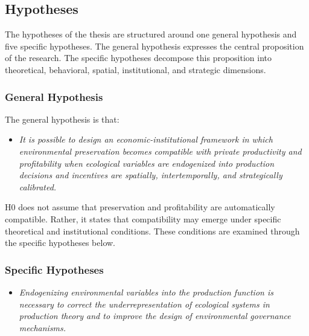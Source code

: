 \subsection{Hypotheses}

The hypotheses of the thesis are structured around one general hypothesis and five specific hypotheses. The general hypothesis expresses the central proposition of the research. The specific hypotheses decompose this proposition into theoretical, behavioral, spatial, institutional, and strategic dimensions.

\subsubsection{General Hypothesis}

The general hypothesis is that:

\begin{itemize}

    \item[\textbf{H0.}]
    
    \textit{It is possible to design an economic-institutional framework in which environmental preservation becomes compatible with private productivity and profitability when ecological variables are endogenized into production decisions and incentives are spatially, intertemporally, and strategically calibrated.}

\end{itemize}

H0 does not assume that preservation and profitability are automatically compatible. Rather, it states that compatibility may emerge under specific theoretical and institutional conditions. These conditions are examined through the specific hypotheses below.

\subsubsection{Specific Hypotheses}

\begin{itemize}

    \item[\textbf{H1.}]
    
    \textit{Endogenizing environmental variables into the production function is necessary to correct the underrepresentation of ecological systems in production theory and to improve the design of environmental governance mechanisms.}

\end{itemize}

